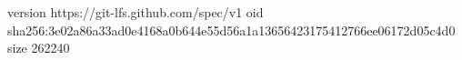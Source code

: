version https://git-lfs.github.com/spec/v1
oid sha256:3e02a86a33ad0e4168a0b644e55d56a1a13656423175412766ee06172d05c4d0
size 262240
